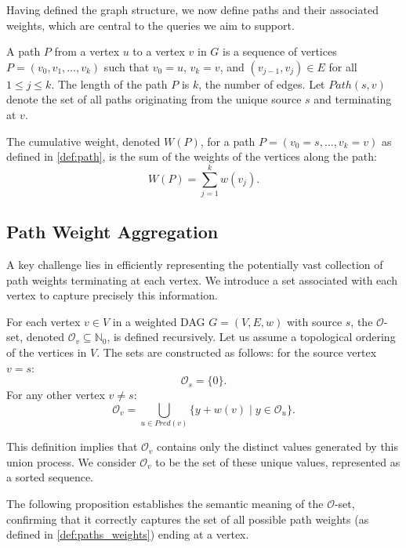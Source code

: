 Having defined the graph structure, we now define paths and their associated weights, which are central to the queries we aim to support.

\begin{definition}
    \label{def:path}
    A path $P$ from a vertex $u$ to a vertex $v$ in $G$ is a sequence of vertices $P = (v_0, v_1, \dots, v_k)$ such that $v_0 = u$, $v_k = v$, and $(v_{j-1}, v_j) \in E$ for all $1 \le j \le k$. The length of the path $P$ is $k$, the number of edges. Let $Path(s, v)$ denote the set of all paths originating from the unique source $s$ and terminating at $v$.
\end{definition}

\begin{definition}
    \label{def:paths_weights}
    The cumulative weight, denoted $W(P)$, for a path $P=(v_0=s, \dots, v_k=v)$ as defined in \ref{def:path}, is the sum of the weights of the vertices along the path:
    \[ W(P) = \sum_{j=1}^{k} w(v_j). \]
\end{definition}


\subsection{Path Weight Aggregation}
\label{subsec:o_set_def}

A key challenge lies in efficiently representing the potentially vast collection of path weights terminating at each vertex. We introduce a set associated with each vertex to capture precisely this information.

\begin{definition}
    \label{def:o_set}
    For each vertex $v \in V$ in a weighted DAG $G=(V, E, w)$ with source $s$, the $\mathcal{O}$-set, denoted $\mathcal{O}_v \subseteq \mathbb{N}_0$, is defined recursively. Let us assume a topological ordering of the vertices in $V$. The sets are constructed as follows: for the source vertex $v = s$:
    \[ \mathcal{O}_s = \{0\}. \]
    For any other vertex $v \neq s$:
    \[ \mathcal{O}_v = \bigcup_{u \in Pred(v)} \{ y + w(v) \mid y \in \mathcal{O}_u \}. \]
\end{definition}
This definition implies that $\mathcal{O}_v$ contains only the distinct values generated by this union process. We consider $\mathcal{O}_v$ to be the set of these unique values, represented as a sorted sequence.


The following proposition establishes the semantic meaning of the $\mathcal{O}$-set, confirming that it correctly captures the set of all possible path weights (as defined in \ref{def:paths_weights}) ending at a vertex.

